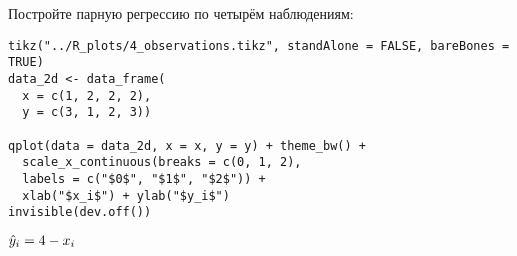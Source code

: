 \begin{problem}
Постройте парную регрессию по четырём наблюдениям:

\begin{verbatim}
tikz("../R_plots/4_observations.tikz", standAlone = FALSE, bareBones = TRUE)
data_2d <- data_frame(
  x = c(1, 2, 2, 2),
  y = c(3, 1, 2, 3))

qplot(data = data_2d, x = x, y = y) + theme_bw() +
  scale_x_continuous(breaks = c(0, 1, 2),
  labels = c("$0$", "$1$", "$2$")) +
  xlab("$x_i$") + ylab("$y_i$")
invisible(dev.off())
\end{verbatim}


\begin{minipage}{\textwidth}
\begin{tikzpicture}[scale = 0.025]

\end{tikzpicture}
\end{minipage}


\begin{sol}
$\hy_i = 4 - x_i$
\end{sol}
\end{problem}


